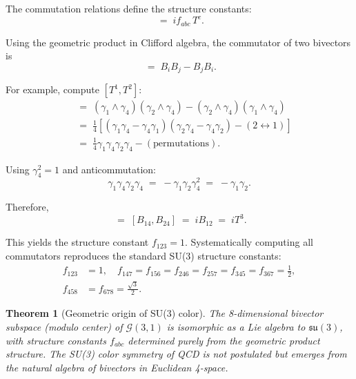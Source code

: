 \documentclass[11pt,a4paper]{article}
\newcommand{\Cl}{\mathcal{G}}
\theoremstyle{definition}
\theoremstyle{plain}
\newtheorem{theorem}{Theorem}[section]
\theoremstyle{remark}
\begin{document}
The commutation relations define the structure constants:
\begin{equation}
[T^a, T^b] \;=\; if_{abc}\,T^c.
\label{eq:commutator}
\end{equation}

Using the geometric product in Clifford algebra, the commutator of two bivectors is
\begin{equation}
[B_i, B_j] \;=\; B_i B_j - B_j B_i.
\end{equation}

For example, compute $[T^1, T^2]$:
\begin{align}
[B_{14}, B_{24}] &\;=\; (\gamma_1 \wedge \gamma_4)(\gamma_2 \wedge \gamma_4) - (\gamma_2 \wedge \gamma_4)(\gamma_1 \wedge \gamma_4) \nonumber \\
&\;=\; \frac{1}{4}[(\gamma_1\gamma_4 - \gamma_4\gamma_1)(\gamma_2\gamma_4 - \gamma_4\gamma_2) - (2 \leftrightarrow 1)] \nonumber \\
&\;=\; \frac{1}{4}\gamma_1\gamma_4\gamma_2\gamma_4 - (\text{permutations}).
\end{align}

Using $\gamma_4^2 = 1$ and anticommutation:
\begin{equation}
\gamma_1\gamma_4\gamma_2\gamma_4 \;=\; -\gamma_1\gamma_2\gamma_4^2 \;=\; -\gamma_1\gamma_2.
\end{equation}

Therefore,
\begin{equation}
[T^1, T^2] \;=\; [B_{14}, B_{24}] \;=\; i B_{12} \;=\; i T^3.
\end{equation}

This yields the structure constant $f_{123} = 1$. Systematically computing all commutators reproduces the standard SU(3) structure constants:
\begin{align}
f_{123} &= 1, \quad f_{147} = f_{156} = f_{246} = f_{257} = f_{345} = f_{367} = \frac{1}{2}, \nonumber \\
f_{458} &= f_{678} = \frac{\sqrt{3}}{2}.
\label{eq:structure-constants}
\end{align}

\begin{theorem}[Geometric origin of SU(3) color]
The 8-dimensional bivector subspace (modulo center) of $\Cl(3,1)$ is isomorphic as a Lie algebra to $\mathfrak{su}(3)$, with structure constants $f_{abc}$ determined purely from the geometric product structure. The SU(3) color symmetry of QCD is not postulated but emerges from the natural algebra of bivectors in Euclidean 4-space.
\end{theorem}
\end{document}
